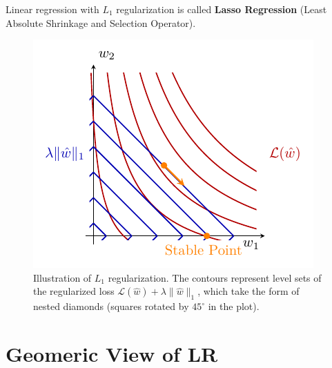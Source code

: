 \documentclass[../main]{subfiles}
\begin{document}
Linear regression with $L_1$ regularization is called \textbf{Lasso Regression} (Least Absolute Shrinkage and Selection Operator).
\begin{figure}[H]
  \centering
  \includegraphics{../../tikz/1/2.pdf}
  \caption{Illustration of $L_1$ regularization. 
  The contours represent level sets of the regularized loss $\mathcal{L}(\hat w) + \lambda \|\hat w\|_1$, 
  which take the form of nested diamonds (squares rotated by $45^\circ$ in the plot). }
\end{figure}
\section{Geomeric View of LR}
\end{document}
